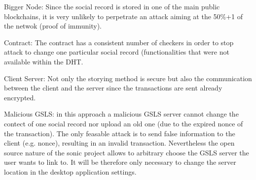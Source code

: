 \begin{list}{}{}
\item {Bigger Node}: Since the social record is stored in one of the main public blockchains, it is very unlikely to perpetrate an attack aiming at the 50\%+1 of the netwok (proof of immunity).
\item {Contract}: The contract has a consistent number of checkers in order to stop attack to change one particular social record (functionalities that were not available within the DHT.
\item {Client Server}: Not only the storying method is secure but also the communication between the client and the server since the transactions are sent already encrypted.
\item {Malicious GSLS}: in this approach a malicious GSLS server cannot change the contect of one social record nor upload an old one (due to the expired nonce of the transaction). The only feasable attack is to send false information to the client (e.g. nonce), resulting in an invalid transaction. Nevertheless the open source nature of the sonic project allows to arbitrary choose the GSLS server the user wants to link to. It will be therefore only necessary to change the server location in the desktop application settings.
\end{list}
